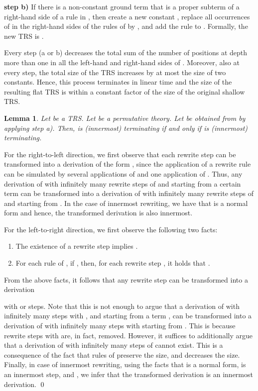 \documentclass{LMCS}
\theoremstyle{plain}
\newtheorem{lemma}[thm]{Lemma}
\begin{document}
\medskip

\noindent
{\bf step b)} If there is a non-constant ground term  that is a proper
subterm of a right-hand side of a rule in , then create
a new constant , replace all occurrences of  in
the right-hand sides of the rules of  by , and add the
rule  to . Formally,
the new TRS  is
.

\medskip

Every step (a or b) decreases the total sum of the number of positions at
depth more than one in all the left-hand and right-hand sides of .
Moreover, also at every step, the total size of the TRS
increases by at most the size of two constants.
Hence, this process terminates in linear time and the size of
the resulting flat TRS is within a constant factor of the size of
the original shallow TRS.



\begin{lemma}\label{lemma-simplifying2}
Let  be a TRS. Let  be a permutative theory.
Let  be obtained from  by applying step a).
Then,  is (innermost) terminating if and only if
 is (innermost) terminating.
\end{lemma}
\proof
For the right-to-left direction, we first observe
that each rewrite step  can be transformed
into a derivation of the form ,
since the application of a rewrite rule 
can be simulated by several applications of 
and one application of .
Thus, any derivation of  with infinitely many
rewrite steps of  and starting from a certain term 
can be transformed into a derivation of 
with infinitely many rewrite steps of  and starting from .
In the case of innermost rewriting,
we have that  is a normal form and hence, 
the transformed derivation is also innermost.

For the left-to-right direction, we first observe the
following two facts:
\begin{enumerate}[]
\item The existence of a rewrite step  implies
.
\item For each rule  of , 
if , then, for each rewrite step
, it holds that
.
\end{enumerate}
From the above facts, it follows that any rewrite step
 can be transformed into a derivation 

with  or  steps. Note that this is not enough to
argue that a derivation of  with infinitely
many steps with , and starting
from a term , can be transformed into a derivation
of  with infinitely many steps with  starting
from . This is because
rewrite steps with  are, in fact, removed. 
However, it suffices to additionally argue that
a derivation of 
with infinitely many steps of  cannot exist.
This is a consequence of the fact
that rules of  preserve the size, and  decreases
the size.
Finally, in case of innermost rewriting, using the facts
that  is a normal form,  is an innermost
step, and , we infer that 
the transformed derivation is an innermost derivation.
\qed
\end{document}

